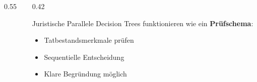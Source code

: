 \documentclass[11pt, aspectratio=169]{beamer}
\begin{document}
\begin{frame}
\begin{columns}[t]
\begin{column}{0.55\textwidth}
\begin{itemize}
            \end{itemize}
        \end{column}
        \begin{column}{0.42\textwidth}
            \begin{block}{Juristische Parallele}
                Decision Trees funktionieren wie ein \textbf{Prüfschema}:
                \begin{itemize}
                    \item Tatbestandsmerkmale prüfen
                    \item Sequentielle Entscheidung
                    \item Klare Begründung möglich
                \end{itemize}
            \end{block}
        \end{column}
    \end{columns}
\end{frame}
\end{document}
